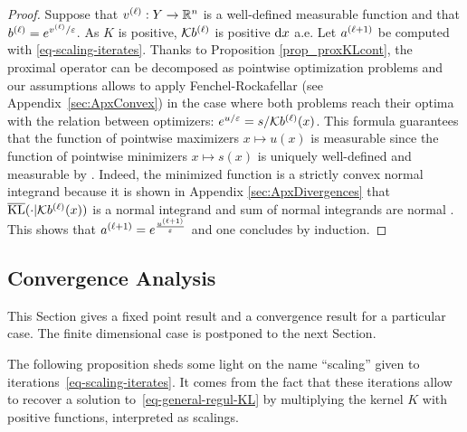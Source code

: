\begin{proof}
Suppose that $v^{(\ell)}: Y\to \mathbb{R}^n$ is a well-defined measurable function and that $b^{(\ell)}=e^{v^{(\ell)}/\varepsilon}$. As $K$ is positive, $\mathcal{K} b^{(\ell)}$ is positive $\mathrm{d} x$ a.e. Let $a^{(\ell+1)}$ be computed with  \eqref{eq-scaling-iterates}. Thanks to Proposition \ref{prop_proxKLcont}, the proximal operator can be decomposed as pointwise optimization problems and our assumptions allows to apply Fenchel-Rockafellar (see Appendix~\ref{sec:ApxConvex}) in the case where both problems reach their optima
with the relation between optimizers: $e^{u/\varepsilon} = s/\mathcal{K} b^{(\ell)}(x)$. 
This formula guarantees that the function of pointwise maximizers $x\mapsto u(x)$ is measurable since the function of pointwise minimizers $x\mapsto s(x)$ is uniquely well-defined and measurable by \cite[Thm. 14.37]{rockafellar2009variational}. Indeed, the minimized function is a strictly convex normal integrand because it is shown in Appendix \ref{sec:ApxDivergences} that $\operatorname{\overline{\operatorname{KL}}}(\cdot|\mathcal{K} b^{(\ell)}(x))$ is a normal integrand and sum of normal integrands are normal \cite[Prop. 14.44]{rockafellar2009variational}.
This shows that $a^{(\ell+1)}=e^{\frac{u^{(\ell+1)}}{\varepsilon}}$ and one concludes by induction.
\end{proof}


\subsection{Convergence Analysis}
This Section gives a fixed point result and a convergence result for a particular case. The finite dimensional case is postponed to the next Section.

The following proposition sheds some light on the name ``scaling'' given to iterations~\eqref{eq-scaling-iterates}. It comes from the fact that these iterations allow to recover a solution to~\eqref{eq-general-regul-KL} by multiplying the kernel $K$ with positive functions, interpreted as scalings.

